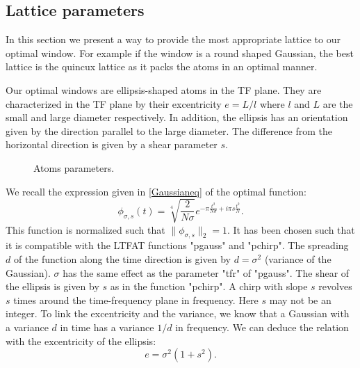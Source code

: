 \documentclass[11pt]{article}
\begin{document}
\subsection{Lattice parameters}

In this section we present a way to provide the most appropriate lattice to our optimal window. For example if the window is a round shaped Gaussian, the best lattice is the quincux lattice as it packs the atoms in an optimal manner.
 
Our optimal windows are ellipsis-shaped atoms in the TF plane. They are characterized in the TF plane by their  excentricity $e=L/l$ where $l$ and $L$ are the small and large diameter respectively. In addition, the ellipsis has an orientation given by the direction parallel to the large diameter. The difference from the horizontal direction is given by a shear parameter $s$.
\begin{figure}
\center
{}
\caption{Atoms parameters.}
\end{figure}
We recall the expression given in \eqref{Gaussianeq} of the optimal function:
\begin{equation}
\phi_{\sigma,s}(t)=\sqrt[4]{\frac{2}{N\sigma}}e^{-\pi\frac{t^2}{N\sigma}+i \pi s \frac{t^2}{N}}.
\end{equation}
This function is normalized such that $\|\phi_{\sigma,s}\|_2=1$. It has been chosen such that it is compatible with the LTFAT functions "pgauss" and "pchirp".
The spreading $d$ of the function along the time direction is given by $d=\sigma^2$ (variance of the Gaussian). $\sigma$ has the same effect as the parameter "tfr" of "pgauss". The shear of   the ellipsis is given by $s$ as in the function "pchirp". A chirp with slope $s$ revolves $s$ times around the time-frequency plane in frequency. Here $s$ may not be an integer. To link the excentricity and the variance, we know that a Gaussian with a variance $d$ in time has a variance $1/d$ in frequency. We can deduce the relation with the excentricity of the ellipsis:
\begin{equation}
e=\sigma^2(1+s^2).
\end{equation}
\end{document}
